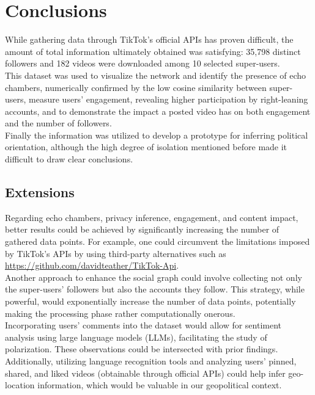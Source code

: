 \section{Conclusions}
While gathering data through TikTok's official APIs has proven difficult, the amount of total information ultimately obtained was satisfying: 35,798 distinct followers and 182 videos were downloaded among 10 selected super-users.\\
This dataset was used to visualize the network and identify the presence of echo chambers, numerically confirmed by the low cosine similarity between super-users, measure users' engagement, revealing higher participation by right-leaning accounts, and to demonstrate the impact a posted video has on both engagement and the number of followers.\\
Finally the information was utilized to develop a prototype for inferring political orientation, although the high degree of isolation mentioned before made it difficult to draw clear conclusions.


\subsection{Extensions}
Regarding echo chambers, privacy inference, engagement, and content impact, better results could be achieved by significantly increasing the number of gathered data points. For example, one could circumvent the limitations imposed by TikTok's APIs by using third-party alternatives such as \url{https://github.com/davidteather/TikTok-Api}.\\
Another approach to enhance the social graph could involve collecting not only the super-users' followers but also the accounts they follow. This strategy, while powerful, would exponentially increase the number of data points, potentially making the processing phase rather computationally onerous.\\
Incorporating users' comments into the dataset would allow for sentiment analysis using large language models (LLMs), facilitating the study of polarization. These observations could be intersected with prior findings. Additionally, utilizing language recognition tools and analyzing users' pinned, shared, and liked videos (obtainable through official APIs) could help infer geo-location information, which would be valuable in our geopolitical context.